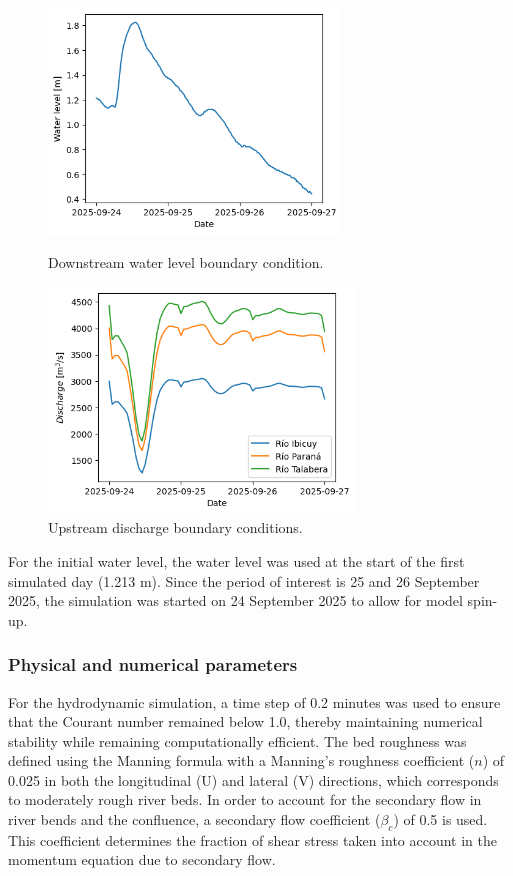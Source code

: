 \begin{figure}[H]
    \centering
    \begin{minipage}[t]{0.48\linewidth}
        \centering
        \includegraphics[height=6cm]{figures/ch7/Downstream_bc.png}
        \caption{Downstream water level boundary condition.}
        \label{fig: Downstream bc}
    \end{minipage}
    \hfill
    \begin{minipage}[t]{0.48\linewidth}
        \centering
        \includegraphics[height=6cm]{figures/ch7/Upstream_bc.png}
        \caption{Upstream discharge boundary conditions.}
        \label{fig: Upstream bc}
    \end{minipage}
\end{figure}

For the initial water level, the water level was used at the start of the first simulated day (1.213 m). Since the period of interest is 25 and 26 September 2025, the simulation was started on 24 September 2025 to allow for model spin-up.

\subsubsection{Physical and numerical parameters}
For the hydrodynamic simulation, a time step of 0.2 minutes was used to ensure that the Courant number remained below 1.0, thereby maintaining numerical stability while remaining computationally efficient. The bed roughness was defined using the Manning formula with a Manning's roughness coefficient ($n$) of 0.025 in both the longitudinal (U) and lateral (V) directions, which corresponds to moderately rough river beds. In order to account for the secondary flow in river bends and the confluence, a secondary flow coefficient ($\beta_c$) of 0.5 is used. This coefficient determines the fraction of shear stress taken into account in the momentum equation due to secondary flow. 

